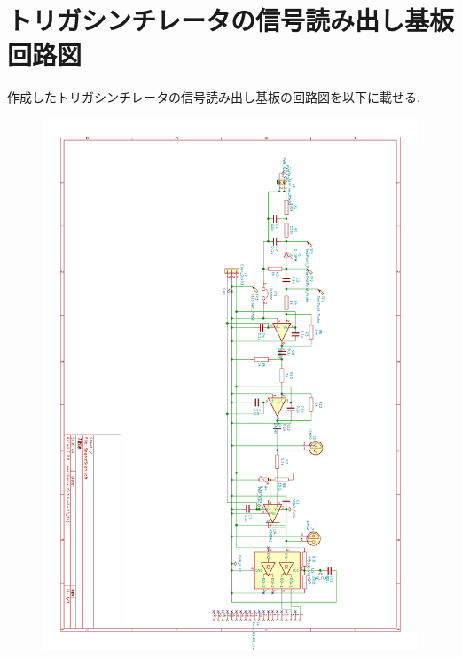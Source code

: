 \chapter{トリガシンチレータの信号読み出し基板回路図}
作成したトリガシンチレータの信号読み出し基板の回路図を以下に載せる.

\begin{figure}[h]
  \centering
  \includegraphics[width=18cm]{./figure/SourceScan.pdf}
\end{figure}

